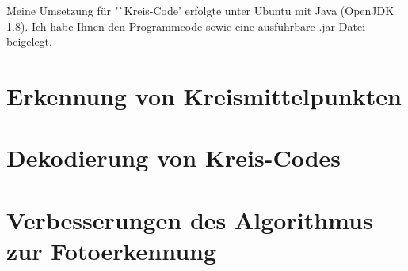 \documentclass[a4paper, DIV=12, firstfoot=false, dvipsnames]{scrreprt}
\newcommand{\task}[1]{Kreis-Code}
\begin{document}
	\titlehead{Teilnahme 6745 (Team 00001) \hfill Laurenz Grote}
	\title{\task}
	\subtitle{Aufgabe 3}
	\author{Laurenz Friedrich Grote}
	\date{}
	\publishers{		
		\centering
		\texttt{[image: frontmatter.png]}
	}
	\maketitle
	\tableofcontents
	\vspace {2em}
	Meine Umsetzung für "`\task"' erfolgte unter Ubuntu mit Java (OpenJDK 1.8). Ich habe Ihnen den Programmcode sowie eine ausführbare .jar-Datei beigelegt.
	\pagebreak
	\chapter{Erkennung von Kreismittelpunkten}
		
	\chapter{Dekodierung von Kreis-Codes}
		
	\chapter{Verbesserungen des Algorithmus zur Fotoerkennung}
		
\end{document}
